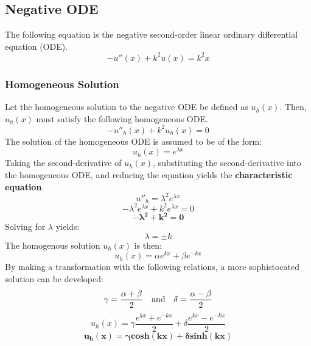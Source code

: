\documentclass[10pt, reqno]{article}		%
\numberwithin{equation}{section}
\begin{document}
\subsection{Negative ODE}

The following equation is the negative second-order linear ordinary differential equation (ODE).
\begin{equation}
-u''(x)+k^2u(x)=k^2x
\end{equation}

\subsubsection{Homogeneous Solution}

Let the homogeneous solution to the negative ODE be defined as $u_h(x)$. Then, $u_h(x)$ must satisfy the following homogeneous ODE.
\begin{equation}
-u''_h(x) + k^2u_h(x) = 0
\end{equation}
The solution of the homogeneous ODE is assumed to be of the form: 
\begin{equation}
u_h(x) = e^{\lambda x}
\end{equation}
Taking the second-derivative of $u_h(x)$, substituting the second-derivative into the homogeneous ODE, and reducing the equation yields the \textbf{characteristic equation}.
\begin{equation}
u''_h = \lambda^2 e^{\lambda x}
\end{equation}
\begin{equation}
-\lambda^2 e^{\lambda x} + k^2e^{\lambda x} = 0
\end{equation}
\begin{equation}
\mathbf{-\lambda^2 + k^2 = 0}
\end{equation}
Solving for $\lambda$ yields:
\begin{equation}
\lambda = \pm k
\end{equation}
The homogenous solution $u_h(x)$ is then:
\begin{equation}
u_h(x) = \alpha e^{kx} + \beta e^{-kx}
\end{equation}
By making a transformation with the following relations, a more sophistocated solution can be developed:
\begin{equation}
\gamma = \frac{\alpha+\beta}{2} \quad \textnormal{and} \quad \delta = \frac{\alpha-\beta}{2}
\end{equation}
\begin{equation}
u_h(x) = \gamma \frac{e^{kx}+e^{-kx}}{2} + \delta \frac{e^{kx}-e^{-kx}}{2}
\end{equation}
\begin{equation}
\mathbf{u_h(x) = \gamma cosh(kx) + \delta sinh(kx)}
\end{equation}
\end{document}

